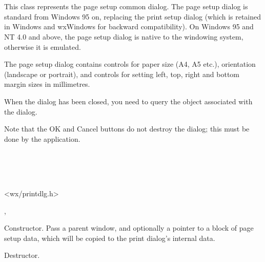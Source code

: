 \section{}\label{wxpagesetupdialog}

This class represents the page setup common dialog. The page setup dialog is standard from
Windows 95 on, replacing the print setup dialog (which is retained in Windows and wxWindows
for backward compatibility). On Windows 95 and NT 4.0 and above, the page setup dialog is
native to the windowing system, otherwise it is emulated.

The page setup dialog contains controls for paper size (A4, A5 etc.), orientation (landscape
or portrait), and controls for setting left, top, right and bottom margin sizes in millimetres.

When the dialog has been closed, you need to query the  object
associated with the dialog.

Note that the OK and Cancel buttons do not destroy the dialog; this must be done by the
application.


\\
\\
\\


<wx/printdlg.h>


, 




Constructor. Pass a parent window, and optionally a pointer to a block of page setup
data, which will be copied to the print dialog's internal data.



Destructor.

